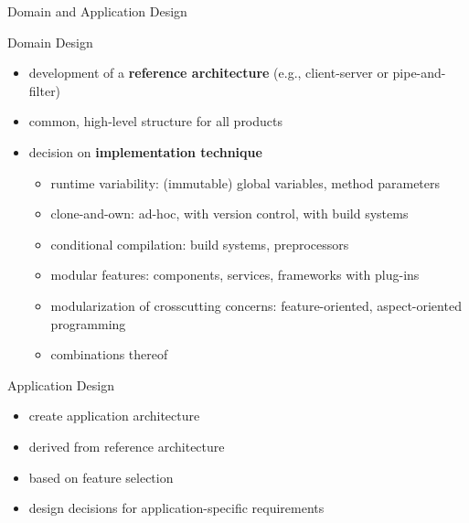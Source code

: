 \begin{frame}{Domain and Application Design}
	\begin{fancycolumns}[T,columns=3,widths={10,50}]
		\renewcommand{\projectcartoonwidth}{1}
	\nextcolumn
		\begin{definition}{Domain Design} %
			\begin{itemize}
				\item development of a \textbf{reference architecture} (e.g., client-server or pipe-and-filter)
				\item common, high-level structure for all products
				\item decision on \textbf{implementation technique}
					\begin{itemize}
						\item runtime variability: (immutable) global variables, method parameters
						\item clone-and-own: ad-hoc, with version control, with build systems
						\item conditional compilation: build systems, preprocessors
						\item modular features: components, services, frameworks with plug-ins
						\item modularization of crosscutting concerns: feature-oriented, aspect-oriented programming
						\item combinations thereof
					\end{itemize}
			\end{itemize}
		\end{definition}
	\nextcolumn
		\begin{definition}{Application Design\\}
			\begin{itemize}
				\item create application architecture
				\item derived from reference architecture
				\item based on feature selection
				\item design decisions for application-specific requirements
			\end{itemize}
		\end{definition}
	\end{fancycolumns}
\end{frame}

